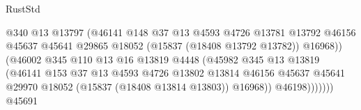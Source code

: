 \begin{lexlean}{RustStd}
\begin{coremodule}
                                                @340
                                                @13
                                                @13797
                                                (@46141
                                                  @148
                                                  @37
                                                  @13
                                                  @4593
                                                  @4726
                                                  @13781
                                                  @13792
                                                  @46156
                                                  @45637
                                                  @45641
                                                  @29865
                                                  @18052
                                                  (@15837 (@18408 @13792 @13782))
                                                  @16968))
                                              (@46002
                                                @345
                                                @110
                                                @13
                                                @16
                                                @13819
                                                @4448
                                                (@45982
                                                  @345
                                                  @13
                                                  @13819
                                                  (@46141
                                                    @153
                                                    @37
                                                    @13
                                                    @4593
                                                    @4726
                                                    @13802
                                                    @13814
                                                    @46156
                                                    @45637
                                                    @45641
                                                    @29970
                                                    @18052
                                                    (@15837 (@18408 @13814 @13803))
                                                    @16968))
                                                @46198)))))))
                                  @45691

\end{coremodule}
\end{lexlean}
